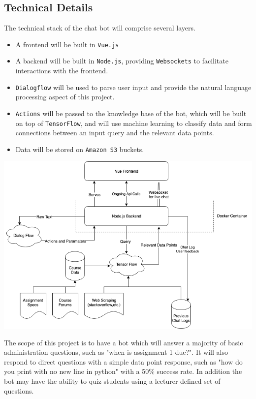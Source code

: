 \documentclass{article}
\begin{document}
\subsection{Technical Details}

The technical stack of the chat bot will comprise several layers.

\begin{itemize}
  \item A frontend will be built in \texttt{Vue.js}
  \item A backend will be built in \texttt{Node.js}, providing \texttt{Websockets} to facilitate interactions with the frontend.
  \item \texttt{Dialogflow} will be used to parse user input and provide the natural language processing aspect of this project.
  \item \texttt{Actions} will be passed to the knowledge base of the bot, which will be built on top of \texttt{TensorFlow}, and will use machine learning to classify data and form connections between an input query and the relevant data points.
  \item Data will be stored on \texttt{Amazon S3} buckets.
\end{itemize}

\includegraphics[width=\textwidth]{architecture_diagram.png}

The scope of this project is to have a bot which will answer a majority of basic administration questions, such as "when is assignment 1 due?". It will also respond to direct questions with a simple data point response, such as "how do you print with no new line in python" with a 50\% success rate. In addition the bot may have the ability to quiz students using a lecturer defined set of questions.
\end{document}
